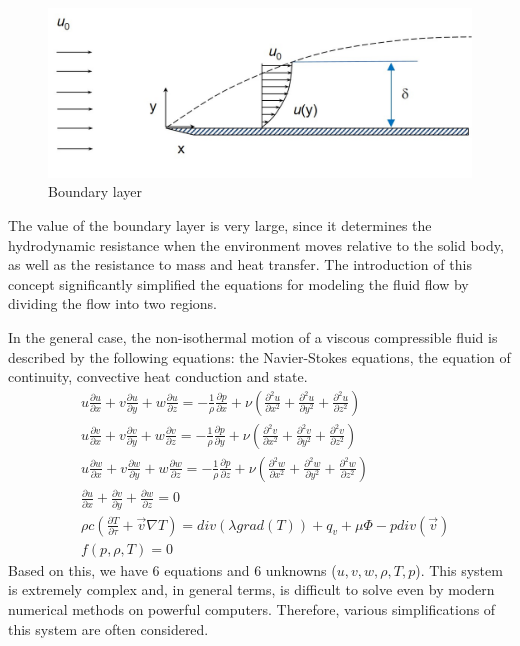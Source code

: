 	\begin{figure}[H]
		\centering
		\includegraphics[width=0.7\linewidth]{../Assets/screenshot001}
		\caption{Boundary layer}
		\label{fig:screenshot001}
	\end{figure}
	The value of the boundary layer is very large, since it determines the hydrodynamic resistance when the environment moves relative to the solid body, as well as the resistance to mass and heat transfer. The introduction of this concept significantly simplified the equations for modeling the fluid flow by dividing the flow into two regions.
	
	In the general case, the non-isothermal motion of a viscous compressible fluid is described by the following equations: the Navier-Stokes equations, the equation of continuity, convective heat conduction and state.
	\begin{align}
		& u\frac{\partial u}{\partial x} + v\frac{\partial u}{\partial y} + w\frac{\partial u}{\partial z} = -\frac{1}{\rho}\frac{\partial p}{\partial x} + \nu(\frac{\partial^2 u}{\partial x^2} + \frac{\partial^2 u}{\partial y^2} + \frac{\partial^2 u}{\partial z^2}) \nonumber\\
		& u\frac{\partial v}{\partial x} + v\frac{\partial v}{\partial y} + w\frac{\partial v}{\partial z} = -\frac{1}{\rho}\frac{\partial p}{\partial y} + \nu(\frac{\partial^2 v}{\partial x^2} + \frac{\partial^2 v}{\partial y^2} + \frac{\partial^2 v}{\partial z^2})\nonumber\\
		& u\frac{\partial w}{\partial x} + v\frac{\partial w}{\partial y} + w\frac{\partial w}{\partial z} = -\frac{1}{\rho}\frac{\partial p}{\partial z} + \nu(\frac{\partial^2 w}{\partial x^2} + \frac{\partial^2 w}{\partial y^2} + \frac{\partial^2 w}{\partial z^2})\nonumber\\
		& \frac{\partial u}{\partial x} + \frac{\partial v}{\partial y} + \frac{\partial w}{\partial z} = 0 \nonumber\\
		& \rho c (\frac{\partial T}{\partial\tau} + \vec{v}\nabla T) = div(\lambda grad(T)) + q_v + \mu\Phi - p div(\vec{v}) \nonumber\\
		& f(p, \rho, T) = 0
	\end{align}
	Based on this, we have 6 equations and 6 unknowns ($u, v, w, \rho, T, p$). This system is extremely complex and, in general terms, is difficult to solve even by modern numerical methods on powerful computers. Therefore, various simplifications of this system are often considered.
	
